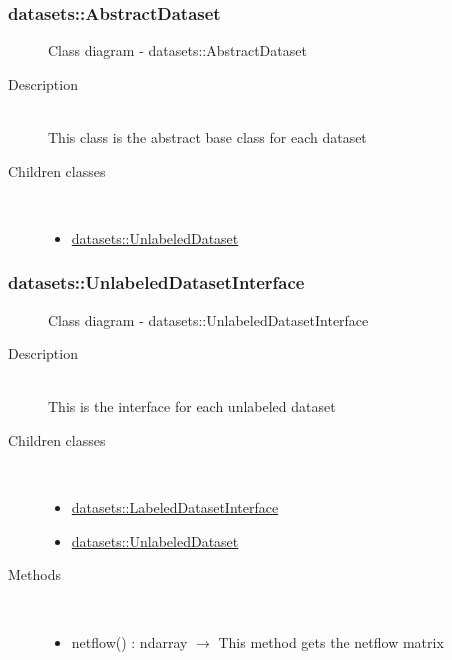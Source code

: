 \hypertarget{datasets::AbstractDataset}{}
\subsubsection[AbstractDataset]{datasets::AbstractDataset}
\begin{figure}[h]
\centering
{}
\caption{Class diagram - datasets::AbstractDataset}
\end{figure}\begin{description}
\item[Description] \hfill \\
 This class is the abstract base class for each dataset
\item[Children classes] \hfill \\
 \vspace{-1cm}
\begin{itemize}
\item \hyperlink{datasets::UnlabeledDataset}{datasets::UnlabeledDataset}
\end{itemize}

\end{description}
\hypertarget{datasets::UnlabeledDatasetInterface}{}
\subsubsection[UnlabeledDatasetInterface]{datasets::UnlabeledDatasetInterface}
\begin{figure}[h]
\centering
{}
\caption{Class diagram - datasets::UnlabeledDatasetInterface}
\end{figure}\begin{description}
\item[Description] \hfill \\
 This is the interface for each unlabeled dataset
\item[Children classes] \hfill \\
 \vspace{-1cm}
\begin{itemize}
\item \hyperlink{datasets::LabeledDatasetInterface}{datasets::LabeledDatasetInterface}
\item \hyperlink{datasets::UnlabeledDataset}{datasets::UnlabeledDataset}
\end{itemize}

\item[Methods] \hfill \\
 \vspace{-1cm}
\begin{itemize}
\item netflow() : ndarray $\rightarrow$ This method gets the netflow matrix
\end{itemize}

\end{description}
\hypertarget{datasets::LabeledDatasetInterface}{}

